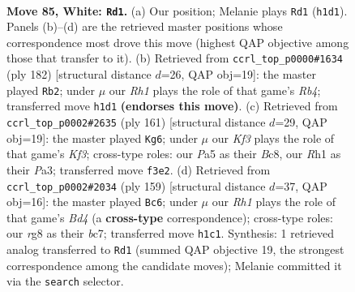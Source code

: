 \documentclass[11pt]{article}
\begin{document}
\clearpage

\begin{figure}[p]\centering
\begin{subfigure}{0.46\textwidth}\centering
\resizebox{\linewidth}{!}{%
\newchessgame
\chessboard[
  setfen={6r1/4k3/p7/Ppp2p1p/2p2P1P/4PKP1/1P6/7R w - - 15 85},
  showmover=false,
  pgfstyle=straightmove, color=movearrow, markmove={h1-d1}
]}
\caption{}
\end{subfigure}\hfill
\begin{subfigure}{0.46\textwidth}\centering
\resizebox{\linewidth}{!}{%
\newchessgame
\chessboard[
  setfen={8/2p5/3p2pk/r2Pp1p1/1RP1P3/5PKP/8/8 w - - 1 92},
  showmover=false,
  pgfstyle=straightmove, color=movearrow, markmove={b4-b2}
]}
\caption{}
\end{subfigure}
\\[4pt]
\begin{subfigure}{0.46\textwidth}\centering
\resizebox{\linewidth}{!}{%
\newchessgame
\chessboard[
  setfen={2b5/8/2P1pk2/1p1p1p2/1P1P1P2/p3P2P/B7/7K b - - 19 81},
  showmover=false,
  pgfstyle=straightmove, color=movearrow, markmove={f6-g6}
]}
\caption{}
\end{subfigure}\hfill
\begin{subfigure}{0.46\textwidth}\centering
\resizebox{\linewidth}{!}{%
\newchessgame
\chessboard[
  setfen={8/2B5/8/1p1b2pk/p4p1p/P4P1P/1P4P1/6K1 b - - 5 80},
  showmover=false,
  pgfstyle=straightmove, color=movearrow, markmove={d5-c6}
]}
\caption{}
\end{subfigure}
\caption{\textbf{Move 85, White: \texttt{Rd1}.} (a) Our position; Melanie plays \texttt{Rd1} (\texttt{h1d1}). Panels (b)--(d) are the retrieved master positions whose correspondence most drove this move (highest QAP objective among those that transfer to it). (b) Retrieved from \texttt{ccrl\_top\_p0000\#1634} (ply 182) [structural distance $d$=26, QAP obj=19]: the master played \texttt{Rb2}; under $\mu$ our \emph{Rh1} plays the role of that game's \emph{Rb4}; transferred move \texttt{h1d1} \textbf{(endorses this move)}. (c) Retrieved from \texttt{ccrl\_top\_p0002\#2635} (ply 161) [structural distance $d$=29, QAP obj=19]: the master played \texttt{Kg6}; under $\mu$ our \emph{Kf3} plays the role of that game's \emph{Kf3}; cross-type roles: our \emph{P}a5 as their \emph{B}c8, our \emph{R}h1 as their \emph{P}a3; transferred move \texttt{f3e2}. (d) Retrieved from \texttt{ccrl\_top\_p0002\#2034} (ply 159) [structural distance $d$=37, QAP obj=16]: the master played \texttt{Bc6}; under $\mu$ our \emph{Rh1} plays the role of that game's \emph{Bd4} (a \textbf{cross-type} correspondence); cross-type roles: our \emph{r}g8 as their \emph{b}c7; transferred move \texttt{h1c1}. Synthesis: 1 retrieved analog transferred to \texttt{Rd1} (summed QAP objective 19, the strongest correspondence among the candidate moves); Melanie committed it via the \texttt{search} selector.}
\label{fig:thought-m168}
\end{figure}
\end{document}

